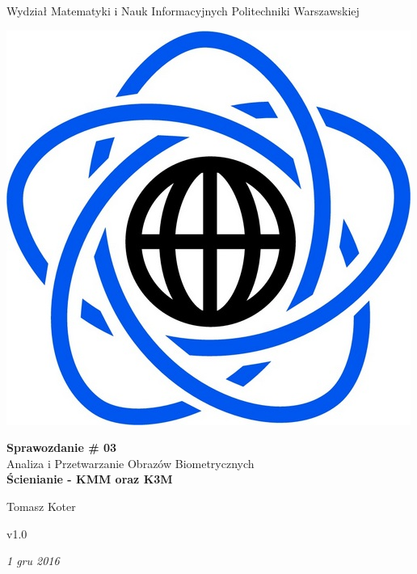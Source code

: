 \documentclass[11pt]{article}
\begin{document}
\begin{titlepage}
\centering

{\large Wydział Matematyki i Nauk Informacyjnych Politechniki Warszawskiej}

\vspace{1cm}
\includegraphics[scale=0.15]{logo}
\vspace{3cm}

{\Huge\bfseries Sprawozdanie \# 03}
\\
\vspace{.2cm}
{\huge Analiza i Przetwarzanie Obrazów Biometrycznych}
\\
\vspace{.2cm}
{\Large\bfseries Ścienianie - KMM oraz K3M}

\vspace{1cm}

{\Large Tomasz Koter}

\vspace{1cm}

{\large v1.0}

\vspace{1cm}

\vfill

{\itshape {\large 1 gru 2016}}
\end{titlepage}

\tableofcontents
\newpage
\end{document}
